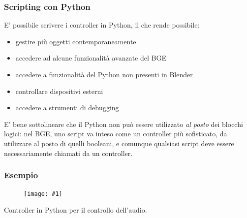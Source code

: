 \documentclass{beamer}
\def\image[#1][#2]{
	\begin{figure}[H]
		\centering
		\texttt{[image: \#1]}
\end{figure}}
\begin{document}
		\begin{frame}
			\frametitle{Scripting con Python}
		E' possibile scrivere i controller in Python, il che rende possibile:
		\begin{itemize}
			\item gestire più oggetti contemporaneamente
			\item accedere ad alcune funzionalità avanzate del BGE
			\item accedere a funzionalità del Python non presenti in Blender
			\item controllare dispositivi esterni
			\item accedere a strumenti di debugging
		\end{itemize}
		E' bene sottolineare che \textcolor{BlenderOrange}{il Python non può essere utilizzato \textit{al posto} dei blocchi logici}: nel BGE, uno script va inteso come un controller più sofisticato, da utilizzare al posto di quelli booleani, e comunque qualsiasi script deve essere necessariamente chiamati da un controller.
	\end{frame}	
\begin{frame}
\frametitle{Esempio} %
\image[images/pysample.png][scale=0.40]
Controller in Python per il controllo dell'audio.
\end{frame}
		
\end{document}
